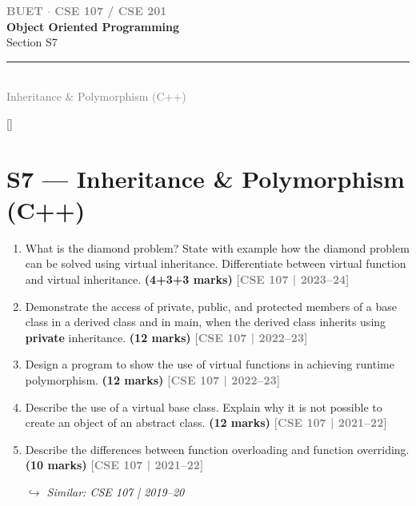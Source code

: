 \documentclass[12pt,a3paper]{article}
\newcommand{\yr}[1]{\hfill\textcolor{gray}{\small\textbf{[#1]}}}
\newcommand{\mk}[1]{\textcolor{orange!70!black}{\small\textbf{(#1 marks)}}}
\newcommand{\variant}[1]{\par\vspace{1pt}\textcolor{blue!50!black}%
  {\footnotesize\textit{$\hookrightarrow$ Similar: #1}}}
\newcommand{\secdivider}[4]{%
  \newpage\thispagestyle{empty}%
  \vspace*{\fill}%
  \begin{tcolorbox}[enhanced,colback=#4!7,colframe=#3,boxrule=1.5pt,arc=8pt,
    left=20pt,right=20pt,top=22pt,bottom=22pt,
    shadow={3pt}{-3pt}{0pt}{black!15}]
    \centering
    {\large\textcolor{gray}{\textbf{BUET $\cdot$ CSE 107 / CSE 201}}}\\[8pt]
    {\fontsize{26}{32}\selectfont\bfseries\textcolor{#3}{Object Oriented Programming}}\\[6pt]
    {\fontsize{15}{19}\selectfont\textcolor{dgray}{#1}}\\[12pt]
    \textcolor{#3!60}{\rule{0.5\textwidth}{0.5pt}}\\[6pt]
    {\small\textcolor{gray}{#2}}
  \end{tcolorbox}%
  \vspace*{\fill}\newpage%
}
\begin{document}
\secdivider{Section S7}{Inheritance \& Polymorphism (C++)}{cG}{cG}
\label{sec:S7}
\titleformat{\section}{\large\bfseries\color{cG}}{}{0em}{}[\titlerule]
\section{S7 --- Inheritance \& Polymorphism (C++)}

\begin{enumerate}
\item What is the diamond problem? State with example how the diamond problem can be solved using virtual inheritance. Differentiate between virtual function and virtual inheritance. \mk{4+3+3}
\yr{CSE 107 | 2023--24}




\item Demonstrate the access of private, public, and protected members of a base class in a derived class and in main, when the derived class inherits using \textbf{private} inheritance. \mk{12}
\yr{CSE 107 | 2022--23}




\item Design a program to show the use of virtual functions in achieving runtime polymorphism. \mk{12}
\yr{CSE 107 | 2022--23}





\item Describe the use of a virtual base class. Explain why it is not possible to create an object of an abstract class. \mk{12}
\yr{CSE 107 | 2021--22}





\item Describe the differences between function overloading and function overriding. \mk{10}
\yr{CSE 107 | 2021--22}
\variant{CSE 107 | 2019--20}





\end{enumerate}
\end{document}
